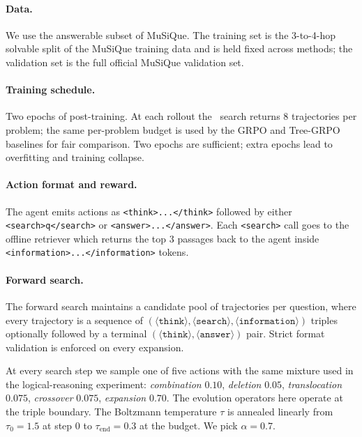 \paragraph{Data.}
We use the answerable subset of MuSiQue. The training set is the
3-to-4-hop solvable split of the MuSiQue training data and is held
fixed across methods; the validation set is the full official MuSiQue
validation set. 

\paragraph{Training schedule.}
Two epochs of post-training. At each
rollout the \ours\ search returns $8$ trajectories per problem; the same per-problem budget is used by the GRPO
and Tree-GRPO baselines for fair comparison. Two epochs are sufficient;
extra epochs lead to overfitting and training collapse.

\paragraph{Action format and reward.}
The agent emits actions as
\verb|<think>...</think>| followed by either \verb|<search>q</search>|
or \verb|<answer>...</answer>|. Each \verb|<search>| call goes to the offline
retriever which returns the top $3$ passages back to the agent inside
\verb|<information>...</information>| tokens. 


\paragraph{Forward search.}
The forward search maintains a candidate pool of trajectories per
question, where every trajectory is a sequence of
$(\langle\texttt{think}\rangle,\langle\texttt{search}\rangle,
\langle\texttt{information}\rangle)$ triples optionally followed by a
terminal $(\langle\texttt{think}\rangle,\langle\texttt{answer}\rangle)$
pair. Strict format validation is enforced on every expansion.

At every search step we sample one of five actions with the same
mixture used in the logical-reasoning experiment:
\emph{combination} $0.10$, \emph{deletion} $0.05$, \emph{translocation}
$0.075$, \emph{crossover} $0.075$, \emph{expansion} $0.70$. The evolution operators here operate at the triple boundary. The Boltzmann temperature $\tau$ is annealed linearly from
$\tau_0=1.5$ at step $0$ to $\tau_\mathrm{end}=0.3$ at the budget. We pick $\alpha=0.7$.


